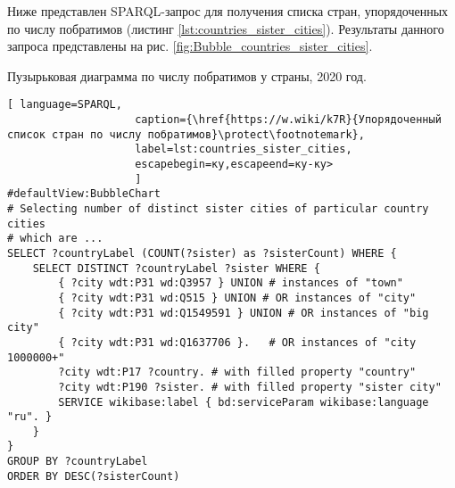 
Ниже представлен SPARQL-запрос для получения списка стран, упорядоченных по числу побратимов (листинг \ref{lst:countries_sister_cities}). Результаты данного запроса представлены на рис. \ref{fig:Bubble_countries_sister_cities}.

\begin{marginfigure}[0.5cm]
{
\setlength{\fboxsep}{0pt}%
\setlength{\fboxrule}{1pt}%
%
}
  \caption{Пузырьковая диаграмма по числу побратимов у страны, 2020 год.}%
  \label{fig:Bubble_countries_sister_cities}%
\end{marginfigure}

\begin{lstlisting}[ language=SPARQL, 
                    caption={\href{https://w.wiki/k7R}{Упорядоченный список стран по числу побратимов}\protect\footnotemark},
                    label=lst:countries_sister_cities, 
                    escapebegin=ку,escapeend=ку-ку>
                    ]
#defaultView:BubbleChart
# Selecting number of distinct sister cities of particular country cities 
# which are ... 
SELECT ?countryLabel (COUNT(?sister) as ?sisterCount) WHERE { 
	SELECT DISTINCT ?countryLabel ?sister WHERE {
		{ ?city wdt:P31 wd:Q3957 } UNION # instances of "town"
		{ ?city wdt:P31 wd:Q515 } UNION # OR instances of "city"
		{ ?city wdt:P31 wd:Q1549591 } UNION # OR instances of "big city"
		{ ?city wdt:P31 wd:Q1637706 }.	 # OR instances of "city 1000000+"
		?city wdt:P17 ?country. # with filled property "country"
		?city wdt:P190 ?sister. # with filled property "sister city"
		SERVICE wikibase:label { bd:serviceParam wikibase:language "ru". }
	}                                 
}
GROUP BY ?countryLabel
ORDER BY DESC(?sisterCount)
\end{lstlisting}

